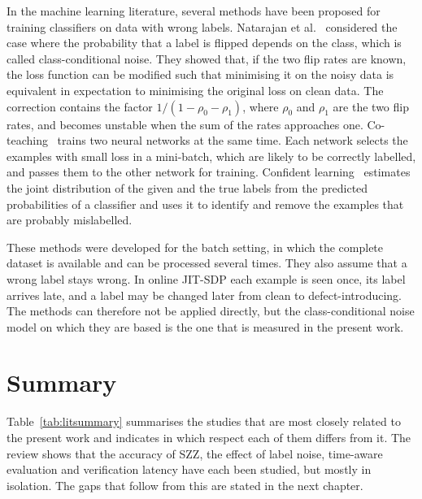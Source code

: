 \documentclass[12pt,a4paper,oneside]{report}
\newcommand{\rhoz}{\rho_0}
\newcommand{\rhoo}{\rho_1}
\begin{document}
In the machine learning literature, several methods have been proposed for
training classifiers on data with wrong labels. Natarajan et
al.~\cite{natarajan2013noisy} considered the case where the probability that
a label is flipped depends on the class, which is called class-conditional
noise. They showed that, if the two flip rates are known, the loss function
can be modified such that minimising it on the noisy data is equivalent in
expectation to minimising the original loss on clean data. The correction
contains the factor $1/(1-\rhoz-\rhoo)$, where $\rhoz$ and $\rhoo$ are the
two flip rates, and becomes unstable when the sum of the rates approaches
one. Co-teaching~\cite{han2018coteaching} trains two neural networks at the
same time. Each network selects the examples with small loss in a mini-batch,
which are likely to be correctly labelled, and passes them to the other
network for training. Confident learning~\cite{northcutt2021confident}
estimates the joint distribution of the given and the true labels from the
predicted probabilities of a classifier and uses it to identify and remove
the examples that are probably mislabelled.

These methods were developed for the batch setting, in which the complete
dataset is available and can be processed several times. They also assume
that a wrong label stays wrong. In online JIT-SDP each example is seen once,
its label arrives late, and a label may be changed later from clean to
defect-introducing. The methods can therefore not be applied directly, but
the class-conditional noise model on which they are based is the one that is
measured in the present work.

\section{Summary}

Table~\ref{tab:litsummary} summarises the studies that are most closely
related to the present work and indicates in which respect each of them
differs from it. The review shows that the accuracy of SZZ, the effect of
label noise, time-aware evaluation and verification latency have each been
studied, but mostly in isolation. The gaps that follow from this are stated
in the next chapter.
\end{document}
